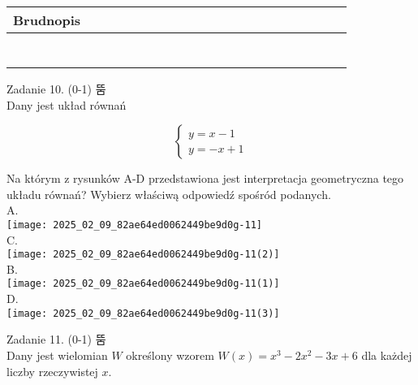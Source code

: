 \documentclass[10pt]{article}
\begin{document}
\begin{center}
\begin{tabular}{|c|c|c|c|c|c|c|c|c|c|c|c|c|c|c|c|c|c|c|c|c|c|c|c|}
\hline
\multicolumn{4}{|l|}{Brudnopis} &  &  &  &  &  &  &  &  &  &  &  &  &  &  &  &  &  &  &  &  \\
\hline
 &  &  &  &  &  &  &  &  &  &  &  &  &  &  &  &  &  &  &  &  &  &  &  \\
\hline
 &  &  &  &  &  &  &  &  &  &  &  &  &  &  &  &  &  &  &  &  &  &  &  \\
\hline
 &  &  &  &  &  &  &  &  &  &  &  &  &  &  &  &  &  &  &  &  &  &  &  \\
\hline
 &  &  &  &  &  &  &  &  &  &  &  &  &  &  &  &  &  &  &  &  &  &  &  \\
\hline
 &  &  &  &  &  &  &  &  &  &  &  &  &  &  &  &  &  &  &  &  &  &  &  \\
\hline
 &  &  &  &  &  &  &  &  &  &  &  &  &  &  &  &  &  &  &  &  &  &  &  \\
\hline
 &  &  &  &  &  &  &  &  &  &  &  &  &  &  &  &  &  &  &  &  &  &  &  \\
\hline
\end{tabular}
\end{center}

Zadanie 10. (0-1) 뚬\\
Dany jest układ równań

\[
\left\{\begin{array}{l}
y=x-1 \\
y=-x+1
\end{array}\right.
\]

Na którym z rysunków A-D przedstawiona jest interpretacja geometryczna tego układu równań? Wybierz właściwą odpowiedź spośród podanych.\\
A.\\
\texttt{[image: 2025\_02\_09\_82ae64ed0062449be9d0g-11]}\\
C.\\
\texttt{[image: 2025\_02\_09\_82ae64ed0062449be9d0g-11(2)]}\\
B.\\
\texttt{[image: 2025\_02\_09\_82ae64ed0062449be9d0g-11(1)]}\\
D.\\
\texttt{[image: 2025\_02\_09\_82ae64ed0062449be9d0g-11(3)]}

Zadanie 11. (0-1) 뚬\\
Dany jest wielomian \(W\) określony wzorem \(W(x)=x^{3}-2 x^{2}-3 x+6\) dla każdej liczby rzeczywistej \(x\).
\end{document}
